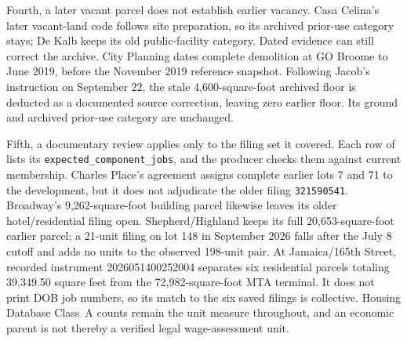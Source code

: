 Fourth, a later vacant parcel does not establish earlier vacancy. Casa
Celina's later vacant-land code follows site preparation, so its archived
prior-use category stays; De Kalb keeps its old public-facility category.
Dated evidence can still correct the archive. City Planning dates complete
demolition at GO Broome to June 2019, before the November 2019 reference
snapshot. Following Jacob's instruction on September 22, the stale
4,600-square-foot archived floor is deducted as a documented source
correction, leaving zero earlier floor. Its ground and archived prior-use
category are unchanged.

Fifth, a documentary review applies only to the filing set it covered. Each
row of  lists its \texttt{expected\_component\_jobs},
and the producer checks them against current membership. Charles Place's
agreement assigns complete earlier lots 7 and 71 to the development, but it
does not adjudicate the older filing \texttt{321590541}. Broadway's
9,262-square-foot building parcel likewise leaves its older hotel/residential
filing open. Shepherd/Highland keeps its full 20,653-square-foot earlier
parcel; a 21-unit filing on lot 148 in September 2026 falls after the July 8
cutoff and adds no units to the observed 198-unit pair. At Jamaica/165th
Street, recorded instrument 2026051400252004 separates six residential parcels
totaling 39,349.50 square feet from the 72,982-square-foot MTA terminal. It
does not print DOB job numbers, so its match to the six saved filings is
collective. Housing Database Class~A counts remain the unit measure
throughout, and an economic parent is not thereby a verified legal
wage-assessment unit.

